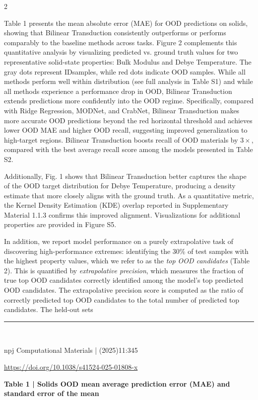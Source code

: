 \documentclass[10pt]{article}
\newcommand{\doiheader}{%
\noindent\begin{minipage}[t]{0.75\textwidth}
{\fontsize{10}{12}\selectfont \textcolor{npjblue}{\href{https://doi.org/10.1038/s41524-025-01808-x}{https://doi.org/10.1038/s41524-025-01808-x}}}
\end{minipage}%
\begin{minipage}[t]{0.25\textwidth}
\raggedleft {\bfseries Article}
\end{minipage}
\par\vspace{4pt}{\color{lightgrayrule}\rule{\textwidth}{0.5pt}}
}
\newcommand{\footerline}[1]{%
\vfill
{\color{lightgrayrule}\rule{\textwidth}{0.5pt}}\\[-1pt]
\noindent\begin{minipage}[t]{0.78\textwidth}
{\fontsize{9}{11}\selectfont \textcolor{footerblue}{npj Computational Materials} | (2025)11:345}
\end{minipage}%
\begin{minipage}[t]{0.22\textwidth}
\raggedleft {\fontsize{9}{11}\selectfont #1}
\end{minipage}
}
\begin{document}
\begin{multicols}{2}
{Table 1 presents the mean absolute error (MAE) for OOD predictions on solids, showing that Bilinear Transduction consistently outperforms or performs comparably to the baseline methods across tasks. Figure 2 complements this quantitative analysis by visualizing predicted vs. ground truth values for two representative solid-state properties: Bulk Modulus and Debye Temperature. The gray dots represent IDsamples, while red dots indicate OOD samples. While all methods perform well within distribution (see full analysis in Table S1) and while all methods experience a performance drop in OOD, Bilinear Transduction extends predictions more confidently into the OOD regime. Specifically, compared with Ridge Regression, MODNet, and CrabNet, Bilinear Transduction makes more accurate OOD predictions beyond the red horizontal threshold and achieves lower OOD MAE and higher OOD recall, suggesting improved generalization to high-target regions. Bilinear Transduction boosts recall of OOD materials by $3\times$, compared with the best average recall score among the models presented in Table S2.

Additionally, Fig. 1 shows that Bilinear Transduction better captures the shape of the OOD target distribution for Debye Temperature, producing a density estimate that more closely aligns with the ground truth. As a quantitative metric, the Kernel Density Estimation (KDE) overlap reported in Supplementary Material 1.1.3 confirms this improved alignment. Visualizations for additional properties are provided in Figure S5.

In addition, we report model performance on a purely extrapolative task of discovering high-performance extremes: identifying the 30\% of test samples with the highest property values, which we refer to as the \textit{top OOD candidates} (Table 2). This is quantified by \textit{extrapolative precision}, which measures the fraction of true top OOD candidates correctly identified among the model's top predicted OOD candidates. The extrapolative precision score is computed as the ratio of correctly predicted top OOD candidates to the total number of predicted top candidates. The held-out sets
}
\end{multicols}

\footerline{2}
\newpage

\doiheader

\vspace{8pt}
{\bfseries\fontsize{14}{16}\selectfont Table 1 | Solids OOD mean average prediction error (MAE) and standard error of the mean}
\end{document}

